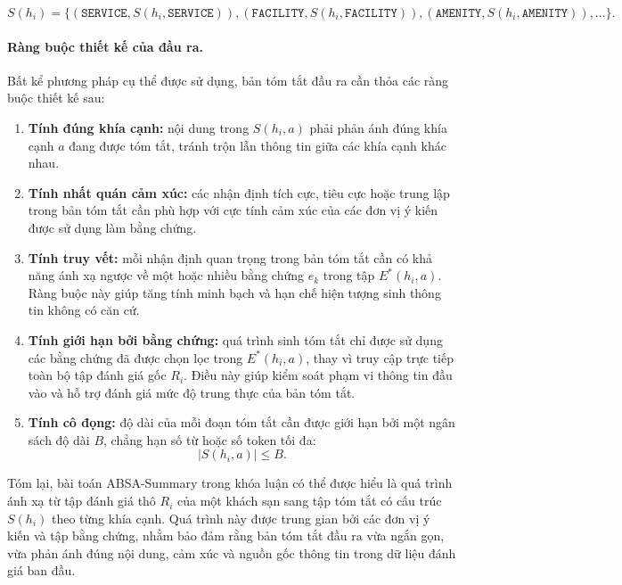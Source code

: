 \begin{equation}
  S(h_i)
  =
  \{
    (\texttt{SERVICE}, S(h_i,\texttt{SERVICE})),
    (\texttt{FACILITY}, S(h_i,\texttt{FACILITY})),
    (\texttt{AMENITY}, S(h_i,\texttt{AMENITY})),
    \dots
  \}.
  \label{eq:structured-summary}
\end{equation}

\paragraph{Ràng buộc thiết kế của đầu ra.}
Bất kể phương pháp cụ thể được sử dụng, bản tóm tắt đầu ra cần thỏa các
ràng buộc thiết kế sau:

\begin{enumerate}[leftmargin=1.2cm]
  \item \textbf{Tính đúng khía cạnh:}
  nội dung trong $S(h_i,a)$ phải phản ánh đúng khía cạnh $a$ đang được tóm
  tắt, tránh trộn lẫn thông tin giữa các khía cạnh khác nhau.

  \item \textbf{Tính nhất quán cảm xúc:}
  các nhận định tích cực, tiêu cực hoặc trung lập trong bản tóm tắt cần
  phù hợp với cực tính cảm xúc của các đơn vị ý kiến được sử dụng làm bằng
  chứng.

  \item \textbf{Tính truy vết:}
  mỗi nhận định quan trọng trong bản tóm tắt cần có khả năng ánh xạ ngược
  về một hoặc nhiều bằng chứng $e_k$ trong tập $E^{*}(h_i,a)$. Ràng buộc
  này giúp tăng tính minh bạch và hạn chế hiện tượng sinh thông tin không
  có căn cứ.

  \item \textbf{Tính giới hạn bởi bằng chứng:}
  quá trình sinh tóm tắt chỉ được sử dụng các bằng chứng đã được chọn lọc
  trong $E^{*}(h_i,a)$, thay vì truy cập trực tiếp toàn bộ tập đánh giá
  gốc $R_i$. Điều này giúp kiểm soát phạm vi thông tin đầu vào và hỗ trợ
  đánh giá mức độ trung thực của bản tóm tắt.

  \item \textbf{Tính cô đọng:}
  độ dài của mỗi đoạn tóm tắt cần được giới hạn bởi một ngân sách độ dài
  $B$, chẳng hạn số từ hoặc số token tối đa:
  \begin{equation}
    |S(h_i,a)| \leq B.
    \label{eq:budget-summary}
  \end{equation}
\end{enumerate}

Tóm lại, bài toán ABSA-Summary trong khóa luận có thể được hiểu là quá
trình ánh xạ từ tập đánh giá thô $R_i$ của một khách sạn sang tập tóm tắt
có cấu trúc $S(h_i)$ theo từng khía cạnh. Quá trình này được trung gian bởi
các đơn vị ý kiến và tập bằng chứng, nhằm bảo đảm rằng bản tóm tắt đầu ra
vừa ngắn gọn, vừa phản ánh đúng nội dung, cảm xúc và nguồn gốc thông tin
trong dữ liệu đánh giá ban đầu.


